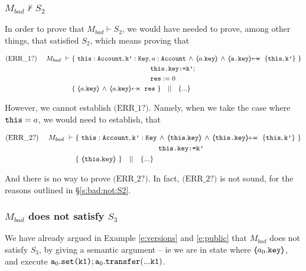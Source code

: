 \subsubsection{$M_{bad}  \nvdash S_2$}
\label{s:bad:not:S2:proof}

In order to prove that $M_{bad}  \vdash S_2$, we would have needed to prove, among other things,  that  satisfied $S_2$, which means proving that

\small{
\begin{align*}
\text{(ERR\_1?)}  \ \ \ \ M_{bad}\ \vdash \ 
		&	\{  \ \prg{this}:\prg{Account}, \prg{k'}:\prg{Key}, a:\prg{Account}\, \wedge\, \inside{a.\prg{key}}  \, \wedge \, \protectedFrom {\prg{a.key}} { \{\prg{this},\prg{k'}\} }\   \} \\
			& \SPT \SPT   \SPT\SPT  \prg{this.key:=k'}; \\
			& \SPT \SPT   \SPT\SPT \prg{res}:=0 \\ 
	       	& \{ \  \inside{a.\prg{key}}  \, \wedge \, \protectedFrom {a.\prg{key}} {\prg{res}} \   \} \ \ \  || \ \ \ 
		   \{ ... \}
\end{align*}
}

However, we cannot  establish $\text{(ERR\_1?)}$.
Namely, when we  take the case where $\mbox{\normalfont{\texttt{this}}}=a$,  we would need to establish, that

\small{
\begin{align*}
\text{(ERR\_2?)}  \ \ \ \ M_{bad}\ \vdash \ 
		&	\{  \ \prg{this}:\prg{Account}, \prg{k'}:\prg{Key}\, \wedge\, \inside{\prg{this}.\prg{key}}  \, \wedge \, \protectedFrom {\prg{this.key}} { \{\prg{this},\prg{k'}\} }\   \} \\
			& \SPT \SPT   \SPT\SPT  \prg{this.key:=k'}  \\
	       	& \{ \ \inside{\prg{this}.\prg{key}}  \   \} \ \ \  || \ \ \ 
		   \{ ... \}
\end{align*}
} 

And there is no way to prove $\text{(ERR\_2?)}$. In fact, $\text{(ERR\_2?)}$  is not sound, for the reasons outlined in \S \ref{s:bad:not:S2}.

\subsubsection{$M_{bad}$ does not satisfy $S_3$}

We have already argued in Example \ref{e:versions} and \ref{e:public} that $M_{bad}$ does not satisfy $S_3$, by giving a semantic argument -- ie we are in state where $ \langle\!\!\langle a_0.\mbox{\normalfont{\texttt{key}}} \rangle\!\!\rangle$, and execute $\mbox{\normalfont{\texttt{a}}}_0.\mbox{\normalfont{\texttt{set(k1)}}}; \mbox{\normalfont{\texttt{a}}}_0.\mbox{\normalfont{\texttt{transfer}}}(...\mbox{\normalfont{\texttt{k1}}})$. 

